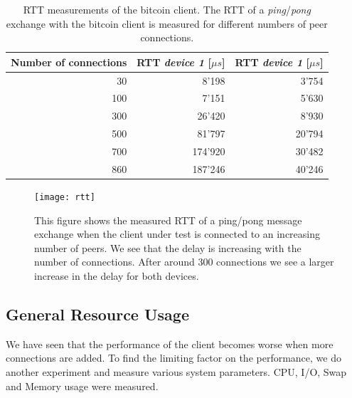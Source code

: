 \begin{table}[tbp]
\begin{center}\begin{minipage}{\textwidth}
\begin{center}
\begin{tabular}{r | r |r}
\textbf{Number of connections} & \textbf{RTT \textit{device 1} [$\mu s$]} & \textbf{RTT \textit{device 1} [$\mu s$]} \\
\hline
30 & 8'198		& 3'754 \\
100 & 7'151 	& 5'630 \\
300 & 26'420 	& 8'930 \\
500 & 81'797 	& 20'794 \\
700 & 174'920 	& 30'482 \\
860 & 187'246 	& 40'246 \\
\end{tabular}
\end{center}
\end{minipage}
\caption[RTT measurements of the bitcoin client.]{RTT measurements of the bitcoin client. The RTT of a \textit{ping}/\textit{pong} exchange with the bitcoin client is measured for different numbers of peer connections.}
\label{tab:performance_degeneration}
\end{center}
\end{table}

\begin{figure}[!bt]
\begin{center}
\texttt{[image: rtt]}
\caption[RTT measurements of the bitcoin client.]{This figure shows the measured RTT of a ping/pong message exchange when the client under test is connected to an increasing number of peers. We see that the delay is increasing with the number of connections. After around 300 connections we see a larger increase in the delay for both devices.}
\label{fig:rtt}
\end{center}
\end{figure}




\subsection{General Resource Usage \label{sec:generalResources}}
We have seen that the performance of the client becomes worse when more connections are added. To find the limiting factor on the performance, we do another experiment and measure various system parameters. CPU, I/O, Swap and Memory usage were measured. 
